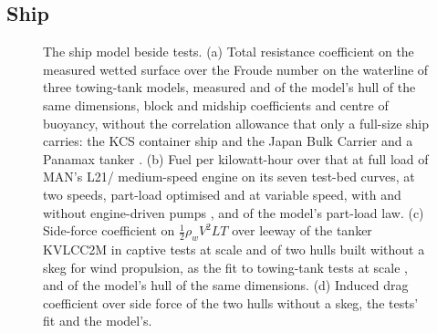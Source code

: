 \begin{table}[tbp]
\centering
\footnotesize
\caption{Fuel saving and fuel saved per day at sea of ships measured at sea, as reported, and of the nearest ship of ours with the same rig area on VLSFO at fixed speed on a fixed course, with its standard error over the departures: the rotor and wing-sail ships at the class's operating speed over the departures of the results, our fuel including the hotel load that TR Lady's leaves out, and the Beluga SkySails' kite at  out to Guadeloupe from each January departure. Method study, .}
\label{tab:measured}
\end{table}

\subsection{Ship}
\label{sec:val_ship}
\label{sec:val_drift}
\label{sec:drift_check}

\begin{figure}[tbp]
\centering
{}
\caption{The ship model beside tests. (a) Total resistance coefficient on the measured wetted surface over the Froude number on the waterline of three towing-tank models, measured and of the model's hull of the same dimensions, block and midship coefficients and centre of buoyancy, without the correlation allowance that only a full-size ship carries: the KCS container ship and the Japan Bulk Carrier \citep{t2015} and a Panamax tanker \citep{farkas2017}. (b) Fuel per kilowatt-hour over that at full load of MAN's L21/ medium-speed engine on its seven test-bed curves, at two speeds, part-load optimised and at variable speed, with and without engine-driven pumps \citep[p.~137]{man2024l2131}, and of the model's part-load law. (c) Side-force coefficient on $\tfrac12\rho_w V^2 L T$ over leeway of the tanker KVLCC2M in captive tests at scale  \citep{toxopeus2011} and of two  hulls built without a skeg for wind propulsion, as the fit to towing-tank tests at scale  \citep{vanderkolk2021}, and of the model's hull of the same dimensions. (d) Induced drag coefficient over side force of the two hulls without a skeg, the tests' fit and the model's.}
\label{fig:validation_ship}
\end{figure}

